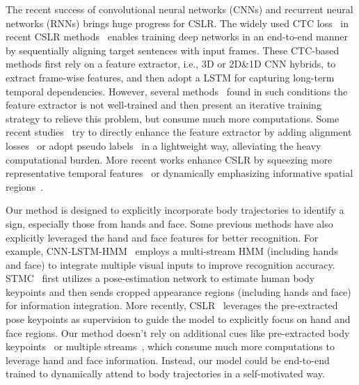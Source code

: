 \documentclass[10pt,twocolumn,letterpaper]{article}
\begin{document}
The recent success of convolutional neural networks (CNNs) and recurrent neural networks (RNNs) brings huge progress for CSLR.  The widely used CTC loss~\cite{graves2006connectionist} in recent CSLR methods~\cite{pu2019iterative,pu2020boosting,cheng2020fully,cui2019deep,niu2020stochastic,Min_2021_ICCV} enables training deep networks in an end-to-end manner by sequentially aligning target sentences with input frames. These CTC-based methods first rely on a feature extractor, i.e., 3D or 2D\&1D CNN hybrids, to extract frame-wise features, and then adopt a LSTM for capturing long-term temporal dependencies. However, several methods~\cite{pu2019iterative,cui2019deep} found in such conditions the feature extractor is not well-trained and then present an iterative training strategy to relieve this problem, but consume much more computations. Some recent studies~\cite{Min_2021_ICCV,cheng2020fully,hao2021self} try to directly enhance the feature extractor by adding alignment losses~\cite{Min_2021_ICCV,hao2021self} or adopt pseudo labels~\cite{cheng2020fully} in a lightweight way, alleviating the heavy computational burden. More recent works enhance CSLR by squeezing more representative temporal features~\cite{hu2022temporal} or dynamically emphasizing informative spatial regions~\cite{hu2023self}.

Our method is designed to explicitly incorporate body trajectories to identify a sign, especially those from hands and face. Some previous methods have also explicitly leveraged the hand and face features for better recognition. For example, CNN-LSTM-HMM~\cite{koller2019weakly} employs a multi-stream HMM (including hands and face) to integrate multiple visual inputs to improve recognition accuracy. STMC~\cite{zhou2020spatial} first utilizes a pose-estimation network to estimate human body keypoints and then sends cropped appearance regions (including hands and face) for information integration. More recently, CSLR~\cite{zuo2022c2slr} leverages the pre-extracted pose keypoints as supervision to guide the model to explicitly focus on hand and face regions. Our method doesn't rely on additional cues like pre-extracted body keypoints~\cite{zuo2022c2slr} or multiple streams~\cite{koller2019weakly}, which consume much more computations to leverage hand and face information. Instead, our model could be end-to-end trained to dynamically attend to body trajectories in a self-motivated way.
\end{document}
